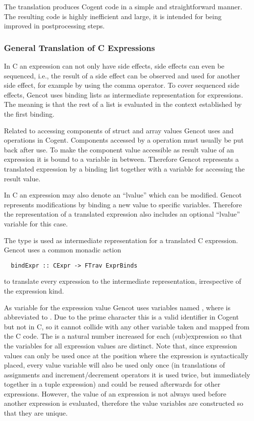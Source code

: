 The translation produces Cogent code in a simple and straightforward manner. The resulting code is highly inefficient
and large, it is intended for being improved in postprocessing steps.

\subsubsection{General Translation of C Expressions}

In C an expression can not only have side effects, side effects can even be sequenced, i.e., the result of a side
effect can be observed and used for another side effect, for example by using the comma operator. To cover sequenced 
side effects, Gencot uses binding lists as intermediate representation for expressions. The meaning is that the 
rest of a list is evaluated in the context established by the first binding. 

Related to accessing components of struct and array values Gencot uses  and  operations in Cogent.
Components accessed by a  operation must usually be put back after use. To make the component value accessible
as result value of an expression it is bound to a variable in between. Therefore Gencot represents a translated expression
by a binding list together with a variable for accessing the result value.

In C an expression may also denote an ``lvalue'' which can be modified. Gencot represents modifications by binding a
new value to specific variables. Therefore the representation of a translated expression also includes an optional
``lvalue'' variable for this case.

The type  is used as intermediate representation for a translated C expression. Gencot uses a common
monadic action
\begin{verbatim}
  bindExpr :: CExpr -> FTrav ExprBinds
\end{verbatim}
to translate every expression to the intermediate representation, irrespective of the expression kind.

As variable for the expression value Gencot uses variables named , where  is abbreviated to 
. Due to the prime character this is
a valid identifier in Cogent but not in C, so it cannot collide with any other variable taken and mapped from the C
code. The  is a natural number increased for each (sub)expression so that the variables for all expression 
values are distinct. Note that, since expression values can only be used once at the position where the expression 
is syntactically placed, every value variable will also be used only once (in translations of assignments and
increment/decrement operators it is used twice, but immediately together in a tuple expression) and could be reused afterwards for 
other expressions. However, the value of an expression is not always used before another expression is evaluated,
therefore the value variables are constructed so that they are unique.

